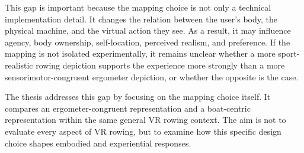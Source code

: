 This gap is important because the mapping choice is not only a technical implementation detail. It changes the relation between the user's body, the physical machine, and the virtual action they see. As a result, it may influence agency, body ownership, self-location, perceived realism, and preference. If the mapping is not isolated experimentally, it remains unclear whether a more sport-realistic rowing depiction supports the experience more strongly than a more sensorimotor-congruent ergometer depiction, or whether the opposite is the case.

The thesis addresses this gap by focusing on the mapping choice itself. It compares an ergometer-congruent representation and a boat-centric representation within the same general VR rowing context. The aim is not to evaluate every aspect of VR rowing, but to examine how this specific design choice shapes embodied and experiential responses.
